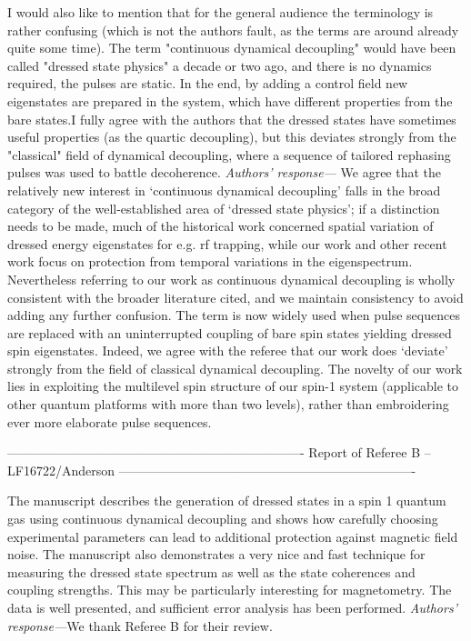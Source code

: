 \documentclass[letterpaper]{article}
\newenvironment{refcomment}{\singlespacing\verbatim}{\endverbatim}
\newcommand{\response}{\emph{Authors' response---}}
\begin{document}
\begin{refcomment}
I would also like to mention that for the general audience the
terminology is rather confusing (which is not the authors fault, as
the terms are around already quite some time). The term "continuous
dynamical decoupling" would have been called "dressed state physics" a
decade or two ago, and there is no dynamics required, the pulses are
static. In the end, by adding a control field new eigenstates are
prepared in the system, which have different properties from the bare
states.I fully agree with the authors that the dressed states have
sometimes useful properties (as the quartic decoupling), but this
deviates strongly from the "classical" field of dynamical decoupling,
where a sequence of tailored rephasing pulses was used to battle
decoherence.
\end{refcomment}
\response 
We agree that the relatively new interest in `continuous dynamical decoupling' falls in the broad category of the well-established area of `dressed state physics'; if a distinction needs to be made, much of the historical work concerned spatial variation of dressed energy eigenstates for e.g. rf trapping, while our work and other recent work focus on protection from temporal variations in the eigenspectrum. 
Nevertheless referring to our work as continuous dynamical decoupling is wholly consistent with the broader literature cited, and we maintain consistency to avoid adding any further confusion.
The term is now widely used when pulse sequences are replaced with an uninterrupted coupling of bare spin states yielding dressed spin eigenstates.
Indeed, we agree with the referee that our work does `deviate' strongly from the field of classical dynamical decoupling. The novelty of our work lies in exploiting the multilevel spin structure of our spin-1 system (applicable to other quantum platforms with more than two levels), rather than embroidering ever more elaborate pulse sequences. 

\newpage
\begin{refcomment}
----------------------------------------------------------------------
Report of Referee B -- LF16722/Anderson
----------------------------------------------------------------------

The manuscript describes the generation of dressed states in a spin 1 
quantum gas using continuous dynamical decoupling and shows how 
carefully choosing experimental parameters can lead to
additional protection against magnetic field noise. The manuscript 
also demonstrates a very nice and fast technique for measuring the 
dressed state spectrum as well as the state coherences and coupling 
strengths. This may be particularly interesting for magnetometry. The 
data is well presented, and sufficient error analysis has been 
performed.
\end{refcomment}
\response We thank Referee B for their review.
\end{document}
